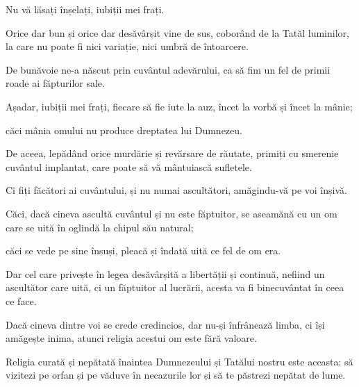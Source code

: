 {Nu vă lăsați înșelați, iubiții mei frați.

Orice dar bun și orice dar desăvârșit vine de sus, coborând de la Tatăl luminilor, la care nu poate fi nici variație, nici umbră de întoarcere.

De bunăvoie ne-a născut prin cuvântul adevărului, ca să fim un fel de primii roade ai făpturilor sale.


\par }{\PP {}Așadar, iubiții mei frați, fiecare să fie iute la auz, încet la vorbă și încet la mânie;

căci mânia omului nu produce dreptatea lui Dumnezeu.

De aceea, lepădând orice murdărie și revărsare de răutate, primiți cu smerenie cuvântul implantat, care poate să vă mântuiască sufletele.


\par }{\PP {}Ci fiți făcători ai cuvântului, și nu numai ascultători, amăgindu-vă pe voi înșivă.

Căci, dacă cineva ascultă cuvântul și nu este făptuitor, se aseamănă cu un om care se uită în oglindă la chipul său natural;

căci se vede pe sine însuși, pleacă și îndată uită ce fel de om era.

Dar cel care privește în legea desăvârșită a libertății și continuă, nefiind un ascultător care uită, ci un făptuitor al lucrării, acesta va fi binecuvântat în ceea ce face.


\par }{\PP {}Dacă cineva dintre voi se crede credincios, dar nu-și înfrânează limba, ci își amăgește inima, atunci religia acestui om este fără valoare.

Religia curată și nepătată înaintea Dumnezeului și Tatălui nostru este aceasta: să vizitezi pe orfan și pe văduve în necazurile lor și să te păstrezi nepătat de lume.



\par }
